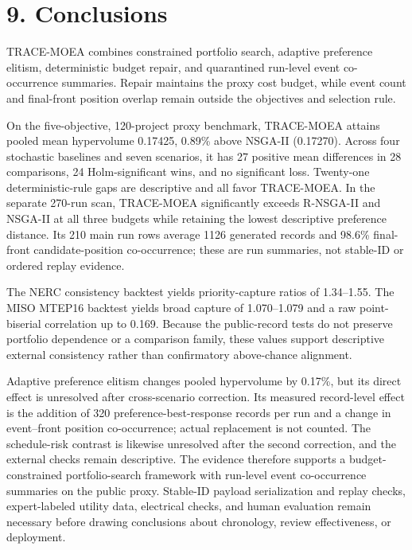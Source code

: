 \documentclass[
  10pt,
  a4paper,
]{article}
\begin{document}
\section{9. Conclusions}\label{conclusions}

TRACE-MOEA combines constrained portfolio search, adaptive preference
elitism, deterministic budget repair, and quarantined run-level event
co-occurrence summaries. Repair maintains the proxy cost budget, while
event count and final-front position overlap remain outside the
objectives and selection rule.

On the five-objective, 120-project proxy benchmark, TRACE-MOEA attains
pooled mean hypervolume 0.17425, 0.89\% above NSGA-II (0.17270). Across
four stochastic baselines and seven scenarios, it has 27 positive mean
differences in 28 comparisons, 24 Holm-significant wins, and no
significant loss. Twenty-one deterministic-rule gaps are descriptive and
all favor TRACE-MOEA. In the separate 270-run scan, TRACE-MOEA
significantly exceeds R-NSGA-II and NSGA-II at all three budgets while
retaining the lowest descriptive preference distance. Its 210 main run
rows average 1126 generated records and 98.6\% final-front
candidate-position co-occurrence; these are run summaries, not stable-ID
or ordered replay evidence.

The NERC consistency backtest yields priority-capture ratios of
1.34--1.55. The MISO MTEP16 backtest yields broad capture of
1.070--1.079 and a raw point-biserial correlation up to 0.169. Because
the public-record tests do not preserve portfolio dependence or a
comparison family, these values support descriptive external consistency
rather than confirmatory above-chance alignment.

Adaptive preference elitism changes pooled hypervolume by 0.17\%, but
its direct effect is unresolved after cross-scenario correction. Its
measured record-level effect is the addition of 320
preference-best-response records per run and a change in event--front
position co-occurrence; actual replacement is not counted. The
schedule-risk contrast is likewise unresolved after the second
correction, and the external checks remain descriptive. The evidence
therefore supports a budget-constrained portfolio-search framework with
run-level event co-occurrence summaries on the public proxy. Stable-ID
payload serialization and replay checks, expert-labeled utility data,
electrical checks, and human evaluation remain necessary before drawing
conclusions about chronology, review effectiveness, or deployment.
\end{document}
